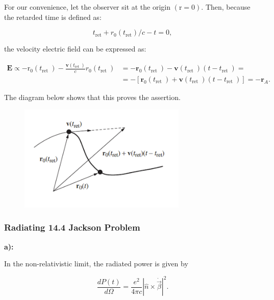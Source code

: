 For our convenience, let the observer sit at the origin $(\mathrm{r}=0)$. Then, because the retarded time is defined as:

\begin{equation}
	t_{\mathrm{ret}}+r_{0}\left(t_{\mathrm{ret}}\right) / c-t=0,
\end{equation}

the velocity electric field can be expressed as:

\begin{equation}
	\begin{split}
			\mathbf{E} \propto-\mathrm{r}_{0}\left(t_{\text {ret }}\right)-\frac{\mathbf{v}\left(t_{\text {ret }}\right)}{c} r_{0}\left(t_{\text {ret }}\right) &=-\mathbf{r}_{0}\left(t_{\text {ret }}\right)-\mathbf{v}\left(t_{\text {ret }}\right)\left(t-t_{\text {ret }}\right)= \\
		&=-\left[\mathbf{r}_{0}\left(t_{\text {ret }}\right)+\mathbf{v}\left(t_{\text {ret }}\right)\left(t-t_{\text {ret }}\right)\right]=-\mathbf{r}_{A} .
	\end{split}
\end{equation}

The diagram below shows that this proves the assertion.
\begin{figure}[h!]
	\includegraphics[width=8cm]{figures/DirectionVelocityField.png}
	\centering
\end{figure}

\subsubsection{Radiating 14.4 Jackson Problem}\label{Radiating 14.4 Jackson Problem}

\textbf{a):}

In the non-relativistic limit, the radiated power is given by

\begin{equation}\label{radiatedpower}
	\frac{d P(t)}{d \Omega}=\frac{e^{2}}{4 \pi c}|\hat{n} \times \dot{\vec{\beta}}|^{2}.
\end{equation}

